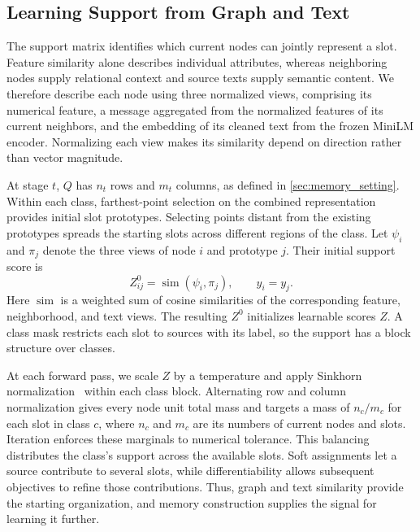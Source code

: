 \subsection{Learning Support from Graph and Text}
\label{sec:method_support}

The support matrix identifies which current nodes can jointly represent a
slot. Feature similarity alone describes individual attributes, whereas
neighboring nodes supply relational context and source texts supply
semantic content. We therefore describe each node using three normalized
views, comprising its numerical feature, a message aggregated from the normalized
features of its current neighbors, and the embedding of its cleaned text
from the frozen MiniLM encoder. Normalizing each view makes its similarity
depend on direction rather than vector magnitude.

At stage $t$, $Q$ has $n_t$ rows and $m_t$ columns, as defined in
\autoref{sec:memory_setting}. Within each
class, farthest-point selection on the combined representation provides
initial slot prototypes. Selecting points distant from the existing
prototypes spreads the starting slots across different regions of the
class. Let $\psi_i$ and $\pi_j$ denote the three views of node $i$ and
prototype $j$. Their initial support score is
\begin{equation}
 Z^0_{ij}=\operatorname{sim}(\psi_i,\pi_j),
 \qquad y_i=y_j .
\label{eq:method_init}
\end{equation}
Here $\operatorname{sim}$ is a weighted sum of cosine similarities of the
corresponding feature, neighborhood, and text views. The resulting
$Z^0$ initializes learnable scores $Z$. A class mask restricts each slot
to sources with its label, so the support has a block structure over
classes.

At each forward pass, we scale $Z$ by a temperature and apply Sinkhorn
normalization~\cite{sinkhorn} within each class block. Alternating row and
column normalization gives every node unit total mass and targets a mass
of $n_c/m_c$ for each slot in class $c$, where $n_c$ and $m_c$ are its
numbers of current nodes and slots. Iteration enforces these marginals
to numerical tolerance. This balancing distributes the class's support
across the available slots. Soft assignments let a source contribute to
several slots, while differentiability allows subsequent objectives to
refine those contributions. Thus, graph and text similarity provide the
starting organization, and memory construction supplies the signal for
learning it further.

